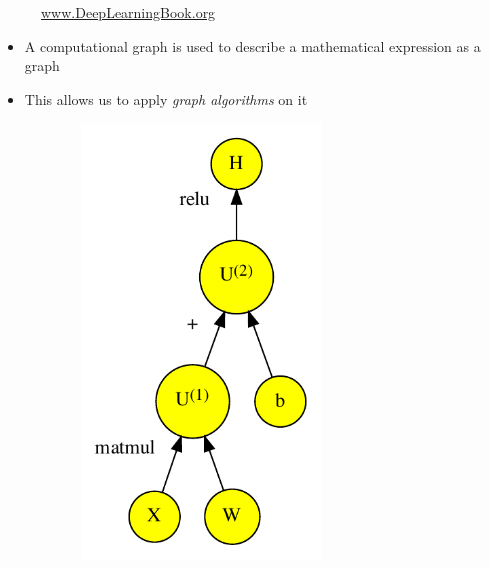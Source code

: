 \documentclass[handout]{beamer}
\begin{document}
\begin{frame}
\begin{figure}
\begin{minipage}{0.45\textwidth}
\begin{figure}[]
            \end{figure}
        \end{minipage}
        \caption{\href{http://www.deeplearningbook.org}{www.DeepLearningBook.org}}
    \end{figure}
    \begin{itemize}[<+->]
        \item A computational graph is used to describe a mathematical expression as a graph
        \item This allows us to apply \emph{graph algorithms} on it
    \end{itemize}
\end{frame}

\begin{frame}
    \begin{figure}
        \centering
        \begin{minipage}{0.45\textwidth}
            \begin{figure}[]
                \centering
                \includegraphics[width=0.7\textwidth]{../plots/computational-graph-c-crop.pdf}

\end{figure}
\end{minipage}
\end{figure}
\end{frame}
\end{document}
